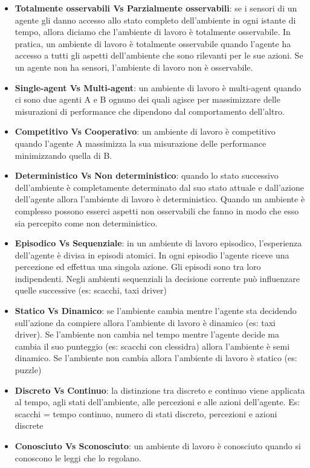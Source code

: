 \begin{itemize}
	\item \textbf{Totalmente osservabili Vs Parzialmente osservabili}:
	      se i
	      sensori di un agente gli danno accesso allo stato completo dell'ambiente
	      in ogni istante di tempo, allora diciamo che l'ambiente di lavoro
	      è totalmente osservabile. In pratica, un ambiente di lavoro è totalmente
	      osservabile quando l'agente ha accesso a tutti gli aspetti dell'ambiente
	      che sono rilevanti per le sue azioni.
	      Se un agente non ha sensori, l'ambiente di lavoro non è osservabile.
	\item \textbf{\foreignlanguage{english}{Single-agent Vs Multi-agent}}:
	      un ambiente di lavoro è
	      \foreignlanguage{english}{multi-agent} quando ci sono due agenti A e B ognuno dei quali agisce
	      per massimizzare delle misurazioni di performance che dipendono dal
	      comportamento dell'altro.
	\item \textbf{Competitivo Vs Cooperativo}:
	      un ambiente di lavoro è
	      competitivo quando l'agente A massimizza la sua misurazione delle
	      performance minimizzando quella di B.
	\item \textbf{Deterministico Vs Non deterministico}:
	      quando lo stato successivo dell'ambiente è completamente determinato dal suo stato attuale e dall'azione dell'agente allora l'ambiente di lavoro è deterministico. Quando un ambiente è complesso possono esserci aspetti non osservabili che fanno in modo che esso sia percepito come non deterministico.
	\item \textbf{Episodico Vs Sequenziale}:
	      in un ambiente di lavoro episodico, l'esperienza dell'agente è divisa in episodi atomici. In ogni episodio l'agente riceve una percezione ed effettua una singola azione. Gli episodi sono tra loro indipendenti. Negli ambienti sequenziali la decisione corrente può influenzare quelle successive (es: scacchi, taxi driver)
	\item \textbf{Statico Vs Dinamico}:
	      se l'ambiente cambia mentre l'agente sta decidendo sull'azione da compiere allora l'ambiente di lavoro è dinamico (es: taxi driver). Se l'ambiente non cambia nel tempo mentre l'agente decide ma cambia il suo punteggio (es: scacchi con clessidra) allora l'ambiente è semi dinamico. Se l'ambiente non cambia allora l'ambiente di lavoro è statico (es: puzzle)
	\item \textbf{Discreto Vs Continuo}:
	      la distinzione tra discreto e continuo viene applicata al tempo, agli stati dell'ambiente, alle percezioni e alle azioni dell'agente.
	      Es: scacchi = tempo continuo, numero di stati discreto, percezioni e azioni discrete
	\item \textbf{Conosciuto Vs Sconosciuto}:
	      un ambiente di lavoro è conosciuto quando si conoscono le leggi che lo regolano.
\end{itemize}

